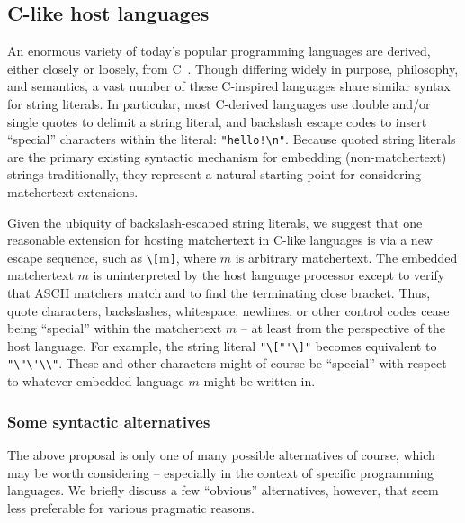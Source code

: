 \subsection{C-like host languages}
\label{sec:host:c}

An enormous variety of today's popular programming languages
are derived, either closely or loosely, from C~\cite{kernighan88c}.
Though differing widely in purpose, philosophy, and semantics,
a vast number of these C-inspired languages share similar syntax
for string literals.
In particular, most C-derived languages use
double and/or single quotes to delimit a string literal,
and backslash escape codes to insert ``special'' characters within the literal:
\eg \verb|"hello!\n"|.
Because quoted string literals
are the primary existing syntactic mechanism
for embedding (non-matchertext) strings traditionally,
they represent a natural starting point for considering matchertext extensions.

Given the ubiquity of backslash-escaped string literals,
we suggest that one reasonable extension for hosting matchertext
in C-like languages is via a new escape sequence,
such as \verb|\[|m\verb|]|,
where $m$ is arbitrary matchertext.
The embedded matchertext $m$ is uninterpreted by the host language processor
except to verify that ASCII matchers match
and to find the terminating close bracket.
Thus, quote characters, backslashes, whitespace, newlines,
or other control codes cease being ``special'' within the matchertext $m$ --
at least from the perspective of the host language.
For example, the string literal \verb|"\["'\]"|
becomes equivalent to \verb|"\"\'\\"|.
These and other characters might of course be ``special'' with respect to
whatever embedded language $m$ might be written in.


\subsubsection{Some syntactic alternatives}

The above proposal is only one of many possible alternatives of course,
which may be worth considering --
especially in the context of specific programming languages.
We briefly discuss a few ``obvious'' alternatives, however,
that seem less preferable for various pragmatic reasons.


